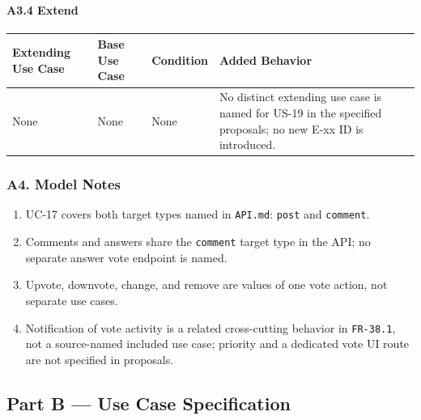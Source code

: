 \documentclass[12pt]{article}
\renewcommand{\baselinestretch}{1.5}
\begin{document}
\hypertarget{sec:a3-4-extend}{}
\paragraph*{A3.4 Extend}
\par\medskip

\begingroup
\small
\renewcommand{\baselinestretch}{1.0}\selectfont
\renewcommand{\arraystretch}{1.15}
\setlength{\tabcolsep}{6pt}
\begin{longtable}{|>{\raggedright\arraybackslash}p{}|>{\raggedright\arraybackslash}p{}|>{\raggedright\arraybackslash}p{}|>{\raggedright\arraybackslash}p{}|}
\hline
\textbf{Extending Use Case} & \textbf{Base Use Case} & \textbf{Condition} & \textbf{Added Behavior} \\ \hline
\endhead
None & None & None & No distinct extending use case is named for US-19 in the specified proposals; no new E-xx ID is introduced. \\ \hline
\end{longtable}
\endgroup
\par\medskip

\hypertarget{sec:a4-model-notes}{}
\subsubsection*{A4. Model Notes}
\par\medskip

\begin{enumerate}
\item UC-17 covers both target types named in \texttt{API.md}: \texttt{post} and \texttt{comment}.
\item Comments and answers share the \texttt{comment} target type in the API; no separate answer vote endpoint is named.
\item Upvote, downvote, change, and remove are values of one vote action, not separate use cases.
\item Notification of vote activity is a related cross-cutting behavior in \texttt{FR-38.1}, not a source-named included use case; priority and a dedicated vote UI route are not specified in proposals.
\end{enumerate}
\par\medskip

\hypertarget{sec:part-b-use-case-specification}{}
\subsection*{Part B --- Use Case Specification}
\par\medskip
\end{document}
